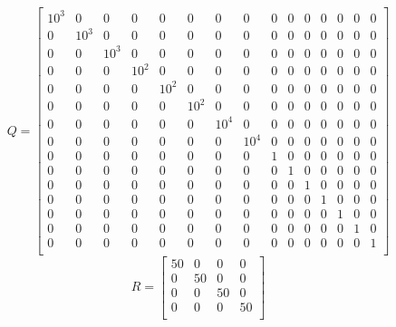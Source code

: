 $$
Q=\begin{bmatrix}
10^3 & 0 & 0 & 0 & 0 & 0 & 0 & 0 & 0 & 0 & 0 & 0 & 0 & 0 & 0 \\
0 & 10^3 & 0 & 0 & 0 & 0 & 0 & 0 & 0 & 0 & 0 & 0 & 0 & 0 & 0 \\
0 & 0 & 10^3 & 0 & 0 & 0 & 0 & 0 & 0 & 0 & 0 & 0 & 0 & 0 & 0 \\
0 & 0 & 0 & 10^2 & 0 & 0 & 0 & 0 & 0 & 0 & 0 & 0 & 0 & 0 & 0 \\
0 & 0 & 0 & 0 & 10^2 & 0 & 0 & 0 & 0 & 0 & 0 & 0 & 0 & 0 & 0 \\
0 & 0 & 0 & 0 & 0 & 10^2 & 0 & 0 & 0 & 0 & 0 & 0 & 0 & 0 & 0 \\
0 & 0 & 0 & 0 & 0 & 0 & 10^4 & 0 & 0 & 0 & 0 & 0 & 0 & 0 & 0 \\
0 & 0 & 0 & 0 & 0 & 0 & 0 & 10^4 & 0 & 0 & 0 & 0 & 0 & 0 & 0 \\
0 & 0 & 0 & 0 & 0 & 0 & 0 & 0 & 1 & 0 & 0 & 0 & 0 & 0 & 0 \\
0 & 0 & 0 & 0 & 0 & 0 & 0 & 0 & 0 & 1 & 0 & 0 & 0 & 0 & 0 \\
0 & 0 & 0 & 0 & 0 & 0 & 0 & 0 & 0 & 0 & 1 & 0 & 0 & 0 & 0 \\
0 & 0 & 0 & 0 & 0 & 0 & 0 & 0 & 0 & 0 & 0 & 1 & 0 & 0 & 0 \\
0 & 0 & 0 & 0 & 0 & 0 & 0 & 0 & 0 & 0 & 0 & 0 & 1 & 0 & 0 \\
0 & 0 & 0 & 0 & 0 & 0 & 0 & 0 & 0 & 0 & 0 & 0 & 0 & 1 & 0 \\
0 & 0 & 0 & 0 & 0 & 0 & 0 & 0 & 0 & 0 & 0 & 0 & 0 & 0 & 1 \\
\end{bmatrix}
$$
$$
R=\begin{bmatrix}
50 & 0 & 0 & 0 \\
0 & 50 & 0 & 0 \\
0 & 0 & 50 & 0 \\
0 & 0 & 0 & 50 \\
\end{bmatrix}
$$